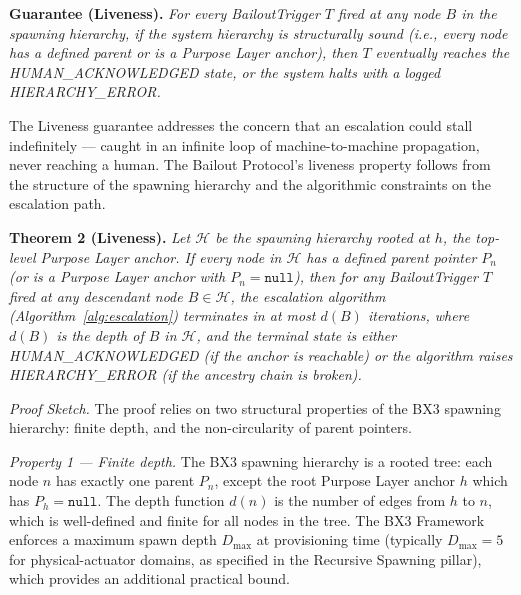 \bigskip

\begin{minipage}{\tmpdimb}
\textbf{Guarantee (Liveness).} \textit{For every BailoutTrigger $T$ fired at any node $B$ in the spawning hierarchy, if the system hierarchy is structurally sound (i.e., every node has a defined parent or is a Purpose Layer anchor), then $T$ eventually reaches the HUMAN\_ACKNOWLEDGED state, or the system halts with a logged HIERARCHY\_ERROR.}
\end{minipage}

\bigskip

The Liveness guarantee addresses the concern that an escalation could stall indefinitely — caught in an infinite loop of machine-to-machine propagation, never reaching a human. The Bailout Protocol's liveness property follows from the structure of the spawning hierarchy and the algorithmic constraints on the escalation path.

\bigskip

\noindent\textbf{Theorem 2 (Liveness).}
\textit{Let $\mathcal{H}$ be the spawning hierarchy rooted at $h$, the top-level Purpose Layer anchor. If every node in $\mathcal{H}$ has a defined parent pointer $P_n$ (or is a Purpose Layer anchor with $P_n = \texttt{null}$), then for any BailoutTrigger $T$ fired at any descendant node $B \in \mathcal{H}$, the escalation algorithm (Algorithm~\ref{alg:escalation}) terminates in at most $d(B)$ iterations, where $d(B)$ is the depth of $B$ in $\mathcal{H}$, and the terminal state is either HUMAN\_ACKNOWLEDGED (if the anchor is reachable) or the algorithm raises HIERARCHY\_ERROR (if the ancestry chain is broken).}

\bigskip

\noindent\textit{Proof Sketch.} The proof relies on two structural properties of the BX3 spawning hierarchy: finite depth, and the non-circularity of parent pointers.

\medskip

\noindent\textit{Property 1 — Finite depth.} The BX3 spawning hierarchy is a rooted tree: each node $n$ has exactly one parent $P_n$, except the root Purpose Layer anchor $h$ which has $P_h = \texttt{null}$. The depth function $d(n)$ is the number of edges from $h$ to $n$, which is well-defined and finite for all nodes in the tree. The BX3 Framework enforces a maximum spawn depth $D_{\max}$ at provisioning time (typically $D_{\max} = 5$ for physical-actuator domains, as specified in the Recursive Spawning pillar), which provides an additional practical bound.


